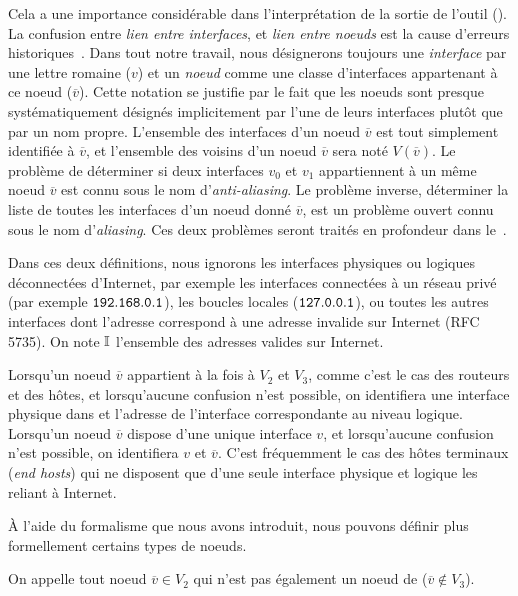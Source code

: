 Cela a une importance considérable dans l'interprétation de la sortie de l'outil
\traceroute (). La confusion entre {\em lien entre
interfaces}, et {\em lien entre noeuds} est la cause d'erreurs
historiques~\cite{willinger,paristraceroute}. Dans tout notre travail, nous
désignerons toujours une {\em interface} par une lettre romaine ($v$) et un {\em
noeud} comme une classe d'interfaces appartenant à ce noeud ($\overline{v}$).
Cette notation se justifie par le fait que les noeuds sont presque
systématiquement désignés implicitement par l'une de leurs interfaces plutôt que
par un nom propre. L'ensemble des interfaces d'un noeud $\overline{v}$ est tout
simplement identifiée à $\overline{v}$, et l'ensemble des voisins d'un noeud
$\overline{v}$ sera noté $V(\overline{v})$. Le problème de déterminer si deux
interfaces $v_0$ et $v_1$ appartiennent à un même noeud $\overline{v}$ est connu
sous le nom d'{\em anti-aliasing}. Le problème inverse, déterminer la liste de
toutes les interfaces d'un noeud donné $\overline{v}$, est un problème ouvert
connu sous le nom d'{\em aliasing}. Ces deux problèmes seront traités en
profondeur dans le~.

Dans ces deux définitions, nous ignorons les interfaces physiques ou logiques
déconnectées d'Internet, par exemple les interfaces connectées à un réseau privé
(par exemple ${\tt 192.168.0.1}$), les boucles locales (${\tt 127.0.0.1}$), ou
toutes les autres interfaces dont l'adresse correspond à une adresse invalide sur Internet
(RFC 5735). On note $\mathbb{I}$ l'ensemble des adresses \ip valides sur
Internet.

Lorsqu'un noeud ${\overline v}$ appartient à la fois à $V_2$ et $V_3$, comme
c'est le cas des routeurs et des hôtes, et lorsqu'aucune confusion n'est
possible, on identifiera une interface physique dans \LL et l'adresse \ip de
l'interface correspondante au niveau logique. Lorsqu'un noeud ${\overline v}$
dispose d'une unique interface $v$, et lorsqu'aucune confusion n'est possible,
on identifiera $v$ et ${\overline v}$. C'est fréquemment le cas des hôtes
terminaux ({\em end hosts}) qui ne disposent que d'une seule interface physique
et logique les reliant à Internet.

À l'aide du formalisme que nous avons introduit, nous pouvons définir plus
formellement certains types de noeuds.

\begin{definition}[Switch]
On appelle \switch tout noeud $\overline{v} \in V_2$ qui n'est pas également un
noeud de \LLL ($\overline{v} \notin V_3$).
\label{def:switch}
\end{definition}

